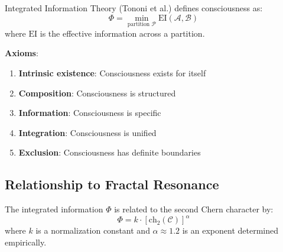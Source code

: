 Integrated Information Theory\cite{tononi2004,tononi2016,koch2016} (Tononi et al.) defines consciousness as:
\begin{equation}
\Phi = \min_{\text{partition } \mathcal{P}} \text{EI}(\mathcal{A}, \mathcal{B})
\end{equation}
where $\text{EI}$ is the effective information across a partition.

\textbf{Axioms}:
\begin{enumerate}
\item \textbf{Intrinsic existence}: Consciousness exists for itself
\item \textbf{Composition}: Consciousness is structured
\item \textbf{Information}: Consciousness is specific
\item \textbf{Integration}: Consciousness is unified
\item \textbf{Exclusion}: Consciousness has definite boundaries
\end{enumerate}

\subsection{Relationship to Fractal Resonance}

\begin{theorem}\label{thm:iit-chern-connection}
The integrated information $\Phi$ is related to the second Chern character by:
\begin{equation}
\boxed{\Phi = k \cdot \left[ \text{ch}_2(\mathcal{C}) \right]^\alpha}
\end{equation}
where $k$ is a normalization constant and $\alpha \approx 1.2$ is an exponent determined empirically.
\end{theorem}

